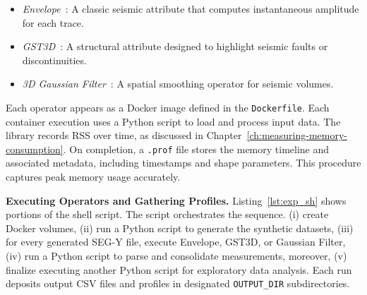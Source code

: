 \begin{itemize}

    \item \emph{Envelope}~\cite{taner1979complex}: A classic seismic attribute that computes instantaneous amplitude for each trace.

    \item \emph{\ac{GST3D}}~\cite{bigun2004recognition}: A structural attribute designed to highlight seismic faults or discontinuities.

    \item \emph{3D Gaussian Filter}~\cite{gonzalez2002digital}: A spatial smoothing operator for seismic volumes.

\end{itemize}

Each operator appears as a Docker image defined in the \texttt{Dockerfile}.
Each container execution uses a Python script to load and process input data.
The \traceq library records \ac{RSS} over time, as discussed in Chapter~\ref{ch:measuring-memory-consumption}.
On completion, a \texttt{.prof} file stores the memory timeline and associated metadata, including timestamps and shape parameters.
This procedure captures peak memory usage accurately.

\vspace{1em}
\noindent
\textbf{Executing Operators and Gathering Profiles.}
Listing~\ref{lst:exp_sh} shows portions of the shell script.
The script orchestrates the sequence.
(i) create Docker volumes,
(ii) run a Python script to generate the synthetic datasets,
(iii) for every generated \ac{SEG-Y} file, execute Envelope, \ac{GST3D}, or Gaussian Filter,
(iv) run a Python script to parse and consolidate measurements,
moreover, (v) finalize executing another Python script for exploratory data analysis.
Each run deposits output \ac{CSV} files and profiles in designated \texttt{OUTPUT\_DIR} subdirectories.


